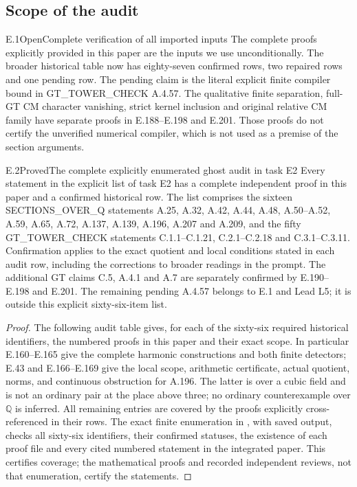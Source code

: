 \subsection{Scope of the audit}
\begin{result}{E.1}{Open}{Complete verification of all imported inputs}
The complete proofs explicitly provided in this paper are the inputs we
use unconditionally.  The broader historical table now has eighty-seven
confirmed rows, two repaired rows and one pending row.  The pending
claim is the literal explicit finite compiler bound in
GT\_TOWER\_CHECK A.4.57.  The qualitative finite separation, full-GT
CM character vanishing, strict kernel inclusion and original relative
CM family have separate proofs in E.188--E.198 and E.201.
Those proofs do not certify the unverified numerical compiler, which
is not used as a premise of the section arguments.
\end{result}
\begin{result}{E.2}{Proved}{The complete explicitly enumerated ghost audit in task E2}
Every statement in the explicit list of task E2 has a complete
independent proof in this paper and a confirmed historical row.
The list comprises the sixteen SECTIONS\_OVER\_Q statements
A.25, A.32, A.42, A.44, A.48, A.50--A.52, A.59, A.65,
A.72, A.137, A.139, A.196, A.207 and A.209, and the fifty
GT\_TOWER\_CHECK statements C.1.1--C.1.21,
C.2.1--C.2.18 and C.3.1--C.3.11.
Confirmation applies to the exact quotient and local conditions
stated in each audit row, including the corrections to broader
readings in the prompt.
The additional GT claims C.5, A.4.1 and A.7 are separately confirmed
by E.190--E.198 and E.201.  The remaining pending A.4.57 belongs
to E.1 and Lead L5; it is outside this explicit sixty-six-item list.
\end{result}
\begin{proof}
The following audit table gives, for each of the sixty-six
required historical identifiers, the numbered proofs in this
paper and their exact scope. In particular E.160--E.165 give
the complete harmonic constructions and both finite detectors;
E.43 and E.166--E.169 give the local scope, arithmetic certificate,
actual quotient, norms, and continuous obstruction for A.196.
The latter is over a cubic field and is not an ordinary pair
at the place above three; no ordinary counterexample over
\(\mathbb Q\) is inferred.
All remaining entries are covered by the proofs explicitly
cross-referenced in their rows. The exact finite enumeration
in , with saved output,
checks all sixty-six identifiers, their confirmed statuses,
the existence of each proof file and every cited numbered
statement in the integrated paper. This certifies coverage;
the mathematical proofs and recorded independent reviews,
not that enumeration, certify the statements.
\end{proof}
